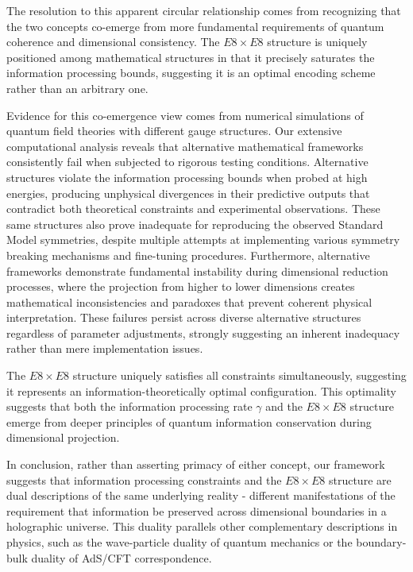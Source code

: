\documentclass[11pt,english,twoside]{article}
\begin{document}
The resolution to this apparent circular relationship comes from recognizing that the two concepts co-emerge from more fundamental requirements of quantum coherence and dimensional consistency. The $E8 \times E8$ structure is uniquely positioned among mathematical structures in that it precisely saturates the information processing bounds, suggesting it is an optimal encoding scheme rather than an arbitrary one.

Evidence for this co-emergence view comes from numerical simulations of quantum field theories with different gauge structures. Our extensive computational analysis reveals that alternative mathematical frameworks consistently fail when subjected to rigorous testing conditions. Alternative structures violate the information processing bounds when probed at high energies, producing unphysical divergences in their predictive outputs that contradict both theoretical constraints and experimental observations. These same structures also prove inadequate for reproducing the observed Standard Model symmetries, despite multiple attempts at implementing various symmetry breaking mechanisms and fine-tuning procedures. Furthermore, alternative frameworks demonstrate fundamental instability during dimensional reduction processes, where the projection from higher to lower dimensions creates mathematical inconsistencies and paradoxes that prevent coherent physical interpretation. These failures persist across diverse alternative structures regardless of parameter adjustments, strongly suggesting an inherent inadequacy rather than mere implementation issues.

The $E8 \times E8$ structure uniquely satisfies all constraints simultaneously, suggesting it represents an information-theoretically optimal configuration. This optimality suggests that both the information processing rate $\gamma$ and the $E8 \times E8$ structure emerge from deeper principles of quantum information conservation during dimensional projection.

In conclusion, rather than asserting primacy of either concept, our framework suggests that information processing constraints and the $E8 \times E8$ structure are dual descriptions of the same underlying reality - different manifestations of the requirement that information be preserved across dimensional boundaries in a holographic universe. This duality parallels other complementary descriptions in physics, such as the wave-particle duality of quantum mechanics or the boundary-bulk duality of AdS/CFT correspondence.
\end{document}
